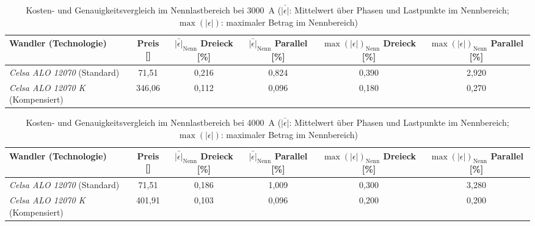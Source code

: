 \begin{table}[H]
    \centering
    \caption{Kosten- und Genauigkeitsvergleich im Nennlastbereich bei \SI{3000}{A} (\(\bar{|\epsilon|}\): Mittelwert über Phasen und Lastpunkte im Nennbereich; \(\max(|\epsilon|)\): maximaler Betrag im Nennbereich)}
    \label{tab:oeko_3000A_kosten_genauigkeit}
    \small
    \setlength{\tabcolsep}{5pt}
    \begin{tabular}{@{}l S[table-format=3.2] S[table-format=2.3] S[table-format=2.3] S[table-format=2.3] S[table-format=2.3]@{}}
        \toprule
        \textbf{Wandler (Technologie)} & {\textbf{Preis [\text{\euro}]}} & {\textbf{\(\bar{|\epsilon|}_{\mathrm{Nenn}}\) Dreieck [\%]}} & {\textbf{\(\bar{|\epsilon|}_{\mathrm{Nenn}}\) Parallel [\%]}} & {\textbf{\(\max(|\epsilon|)_{\mathrm{Nenn}}\) Dreieck [\%]}} & {\textbf{\(\max(|\epsilon|)_{\mathrm{Nenn}}\) Parallel [\%]}} \\
        \midrule
        \textit{Celsa ALO 12070} (Standard) & 71,51 & 0,216 & 0,824 & 0,390 & 2,920 \\
        \textit{Celsa ALO 12070 K} (Kompensiert) & 346,06 & 0,112 & 0,096 & 0,180 & 0,270 \\
        \bottomrule
    \end{tabular}
\end{table}

\begin{table}[H]
    \centering
    \caption{Kosten- und Genauigkeitsvergleich im Nennlastbereich bei \SI{4000}{A} (\(\bar{|\epsilon|}\): Mittelwert über Phasen und Lastpunkte im Nennbereich; \(\max(|\epsilon|)\): maximaler Betrag im Nennbereich)}
    \label{tab:oeko_4000A_kosten_genauigkeit}
    \small
    \setlength{\tabcolsep}{5pt}
    \begin{tabular}{@{}l S[table-format=3.2] S[table-format=2.3] S[table-format=2.3] S[table-format=2.3] S[table-format=2.3]@{}}
        \toprule
        \textbf{Wandler (Technologie)} & {\textbf{Preis [\text{\euro}]}} & {\textbf{\(\bar{|\epsilon|}_{\mathrm{Nenn}}\) Dreieck [\%]}} & {\textbf{\(\bar{|\epsilon|}_{\mathrm{Nenn}}\) Parallel [\%]}} & {\textbf{\(\max(|\epsilon|)_{\mathrm{Nenn}}\) Dreieck [\%]}} & {\textbf{\(\max(|\epsilon|)_{\mathrm{Nenn}}\) Parallel [\%]}} \\
        \midrule
        \textit{Celsa ALO 12070} (Standard) & 71,51 & 0,186 & 1,009 & 0,300 & 3,280 \\
        \textit{Celsa ALO 12070 K} (Kompensiert) & 401,91 & 0,103 & 0,096 & 0,200 & 0,200 \\
        \bottomrule
    \end{tabular}
\end{table}
